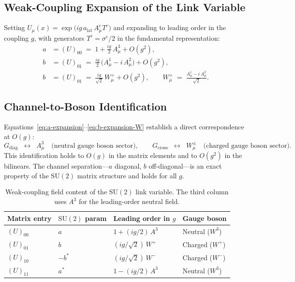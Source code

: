 \documentclass[12pt]{article}
\numberwithin{equation}{section}
\theoremstyle{plain}
\theoremstyle{definition}
\theoremstyle{remark}
\newcommand{\su}{\mathrm{SU}}              %
\newcommand{\Gdiag}{G_{\mathrm{diag}}}     %
\newcommand{\Gcross}{G_{\mathrm{cross}}}   %
\begin{document}
	
	\subsection{Weak-Coupling Expansion of the Link Variable}
	\label{sec:weak-coupling-exp}
	
	Setting $U_\mu(x) = \exp\!\bigl(i g\,a_{\mathrm{lat}}\,A^c_\mu T^c\bigr)$
	and expanding to leading order in the coupling $g$, with generators
	$T^c = \sigma^c/2$ in the fundamental representation:
	\begin{align}
		a &= (U)_{00} \;=\; 1 + \frac{ig}{2}\,A^{3}_\mu + O(g^2),
		\label{eq:a-expansion}\\[2pt]
		b &= (U)_{01} \;=\; \frac{ig}{2}\,
		\bigl(A^{1}_\mu - i\,A^{2}_\mu\bigr) + O(g^2),
		\label{eq:b-expansion-naive}\\[2pt]
		b &= (U)_{01} \;=\; \frac{ig}{\sqrt{2}}\,W^{+}_\mu + O(g^2),
		\qquad
		W^{+}_\mu \;=\;
		\frac{A^{1}_\mu - i\,A^{2}_\mu}{\sqrt{2}}.
		\label{eq:b-expansion-W}
	\end{align}
	
	\subsection{Channel-to-Boson Identification}
	\label{sec:channel-boson}
	
	Equations~\eqref{eq:a-expansion}--\eqref{eq:b-expansion-W} establish
	a direct correspondence at $O(g)$:
	\[
	\Gdiag \;\;\longleftrightarrow\;\; A^{3}_\mu
	\quad\text{(neutral gauge boson sector)},
	\qquad
	\Gcross \;\;\longleftrightarrow\;\; W^{\pm}_\mu
	\quad\text{(charged gauge boson sector)}.
	\]
	This identification holds to $O(g)$ in the matrix elements and to
	$O(g^2)$ in the bilinears.  The channel separation---$a$ diagonal,
	$b$ off-diagonal---is an exact property of the $\su(2)$ matrix
	structure and holds for all $g$.
	
	\begin{table}[ht]
		\centering
		\caption{Weak-coupling field content of the $\su(2)$ link variable.
			The third column uses $A^{3}$ for the leading-order neutral
			field.}
		\label{tab:weak-coupling-content}
		\small
		\setlength{\tabcolsep}{8pt}
		\begin{tabular}{@{}llll@{}}
			\toprule
			\textbf{Matrix entry} & \textbf{$\su(2)$ param}
			& \textbf{Leading order in $g$} & \textbf{Gauge boson}\\
			\midrule
			$(U)_{00}$ & $a$
			& $1 + (ig/2)\,A^{3}$ & Neutral ($W^{3}$)\\
			$(U)_{01}$ & $b$
			& $(ig/\sqrt{2})\,W^{+}$ & Charged ($W^{+}$)\\
			$(U)_{10}$ & $-b^{*}$
			& $(ig/\sqrt{2})\,W^{-}$ & Charged ($W^{-}$)\\
			$(U)_{11}$ & $a^{*}$
			& $1 - (ig/2)\,A^{3}$ & Neutral ($W^{3}$)\\
			\bottomrule
		\end{tabular}
	\end{table}
	
\end{document}
